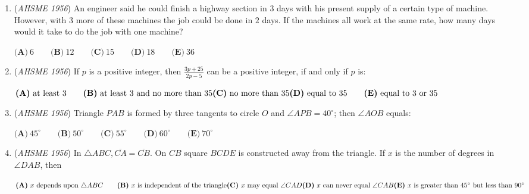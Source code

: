 \begin{enumerate}
 $\textbf{(A)}\ \text{any positive value less than }1 \qquad \\ \textbf{(B)}\ \text{any value less than }1 \\ \textbf{(C)}\ \text{the value zero only}\qquad \\ \textbf{(D)}\ \text{any non-negative value}\qquad \\ \textbf{(E)}\ \text{any value}$


	\item (\textit{AHSME 1956}) An engineer said he could finish a highway section in $3$ days with his present supply of a certain type of machine. 
However, with $3$ more of these machines the job could be done in $2$ days. If the machines all work at the same rate, 
how many days would it take to do the job with one machine? 


 $\textbf{(A)}\ 6 \qquad \textbf{(B)}\ 12 \qquad \textbf{(C)}\ 15 \qquad \textbf{(D)}\ 18 \qquad \textbf{(E)}\ 36$


	\item (\textit{AHSME 1956}) If $p$ is a positive integer, then $\frac {3p + 25}{2p - 5}$ can be a positive integer, if and only if $p$ is: 


 $\textbf{(A)}\ \text{at least }3\qquad \textbf{(B)}\ \text{at least }3\text{ and no more than }35\qquad \\ \textbf{(C)}\ \text{no more than }35  \textbf{(D)}\ \text{equal to }35 \qquad \textbf{(E)}\ \text{equal to }3\text{ or }35$


	\item (\textit{AHSME 1956}) Triangle $PAB$ is formed by three tangents to circle $O$ and $\angle APB = 40^{\circ}$; then $\angle AOB$ equals: 


 $\textbf{(A)}\ 45^{\circ}\qquad \textbf{(B)}\ 50^{\circ}\qquad \textbf{(C)}\ 55^{\circ}\qquad \textbf{(D)}\ 60^{\circ}\qquad \textbf{(E)}\ 70^{\circ}$


	\item (\textit{AHSME 1956}) In $\triangle ABC, \overline{CA} = \overline{CB}$. On $CB$ square $BCDE$ is constructed away from the triangle. 
If $x$ is the number of degrees in $\angle DAB$, then 


 $\textbf{(A)}\ x\text{ depends upon }\triangle ABC \qquad \textbf{(B)}\ x\text{ is independent of the triangle} \\ \textbf{(C)}\ x\text{ may equal }\angle CAD \qquad \\ \textbf{(D)}\ x\text{ can never equal }\angle CAB \\ \textbf{(E)}\ x\text{ is greater than }45^{\circ}\text{ but less than }90^{\circ}$


\end{enumerate}